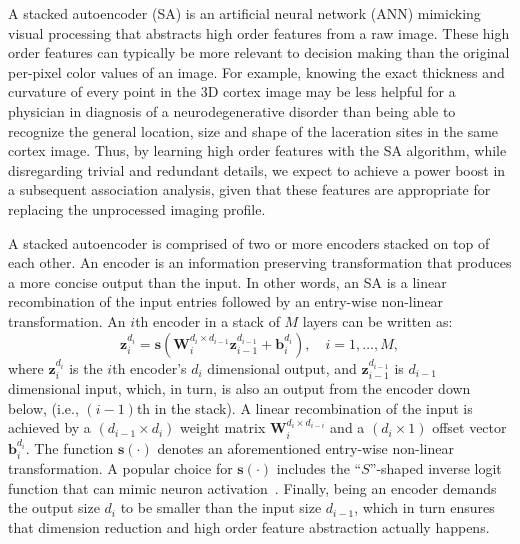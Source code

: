 \documentclass[11pt]{article}
\newcommand{\vecEC}[1]{\boldsymbol{#1}}
\newcommand{\WEC}{\vecEC{W}}                   %
\newcommand{\WEI}[3]{\WEC_{#1}^{d_{#2} \times d_{#3}}} %
\newcommand{\bEC}{\vecEC{b}}    %
\newcommand{\bEI}[2]{\bEC_{#1}^{d_{#2}}} %
\newcommand{\zEC}{\vecEC{z}}
\newcommand{\zEI}[2]{\zEC_{#1}^{d_{#2}}}
\begin{document}
A stacked autoencoder (SA) is an artificial neural network (ANN) mimicking visual processing that abstracts high order features from a raw image. These high order features can typically be more relevant to decision making than the original per-pixel color values of an image. For example, knowing the exact thickness and curvature of every point in the 3D cortex image may be less helpful for a physician in diagnosis of a neurodegenerative disorder than being able to recognize the general location, size and shape of the laceration sites in the same cortex image. Thus, by learning high order features with the SA algorithm, 
while disregarding trivial and redundant details, we expect to achieve a power boost in a subsequent association analysis, given that these features are appropriate for replacing the unprocessed imaging profile.

A stacked autoencoder is comprised of two or more encoders stacked on top of each other. An encoder is an information preserving transformation that produces a more concise output than the input. In other words, an SA is a linear recombination of the input entries followed by an entry-wise non-linear transformation. An $i$th encoder in a stack of $M$ layers can be written as:
\begin{equation} \label{eq:AE}
  \zEC_i^{d_i} = \boldsymbol{s}(\WEI{i}{i}{i-1} \zEI{i-1}{i-1} + \bEI{i}{i}), \quad i = 1, \ldots, M,
\end{equation}
where $\zEI{i}{i}$ is the $i$th encoder's $d_i$ dimensional output, and $\zEI{i-1}{i-1}$ is $d_{i-1}$ dimensional input, which, in turn, is also an output from the encoder down below, (i.e., $(i-1)$th in the stack). A linear recombination of the input is achieved by a $(d_{i-1} \times d_i)$ weight matrix $\WEI{i}{i}{i-i}$ and a $(d_i\times 1)$ offset vector $\bEI{i}{i}$. The function $\boldsymbol{s}(\cdot)$ denotes an aforementioned entry-wise non-linear transformation. A popular choice for $\boldsymbol{s}(\cdot)$ includes the ``$S$''-shaped inverse logit function that can mimic neuron activation~\citep{SGM1, NNE90}. Finally, being an encoder demands the output size $d_i$ to be smaller than the input size $d_{i-1}$, which in turn ensures that dimension reduction and high order feature abstraction actually happens.
\end{document}
